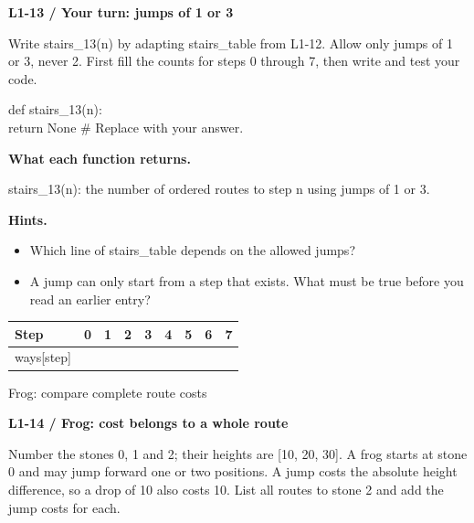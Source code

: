 \documentclass[11pt,a4paper]{article}
\begin{document}
\par\noindent\begin{minipage}{\linewidth}
\textbf{L1-13 / Your turn: jumps of 1 or 3}\par\smallskip Write stairs\_13(n) by adapting stairs\_table from L1-12. Allow only jumps of 1 or 3, never 2. First fill the counts for steps 0 through 7, then write and test your code.\par
\par{}\par\smallskip\noindent\colorbox{codepaper}{\parbox{\dimexpr\linewidth-2\fboxsep\relax}{\small\ttfamily\raggedright def stairs\_13(n):\\\hspace*{2.4em}return None  \# Replace with your answer.}}\par
{\small\textbf{What each function returns.}\par stairs\_13(n): the number of ordered routes to step n using jumps of 1 or 3.\par }
{\small\textbf{Hints.}}\begin{itemize}\item Which line of stairs\_table depends on the allowed jumps?\item A jump can only start from a step that exists. What must be true before you read an earlier entry?\end{itemize}
\par\smallskip \begingroup\small\setlength{\tabcolsep}{4pt}\renewcommand{\arraystretch}{1.35}\begin{tabularx}{\linewidth}{>{\raggedright\arraybackslash}l>{\raggedright\arraybackslash}X>{\raggedright\arraybackslash}X>{\raggedright\arraybackslash}X>{\raggedright\arraybackslash}X>{\raggedright\arraybackslash}X>{\raggedright\arraybackslash}X>{\raggedright\arraybackslash}X>{\raggedright\arraybackslash}X}\toprule\textbf{Step} & \textbf{0} & \textbf{1} & \textbf{2} & \textbf{3} & \textbf{4} & \textbf{5} & \textbf{6} & \textbf{7}\\\midrule
ways[step] & 1 &  &  &  &  &  &  & \\
\bottomrule\end{tabularx}\endgroup\par\smallskip 
\end{minipage}\par\vspace{2mm}
\par\noindent\begin{minipage}{\linewidth}
{\heavy\fontsize{12}{15}\selectfont Frog: compare complete route costs\par}\medskip
\textbf{L1-14 / Frog: cost belongs to a whole route}\par\smallskip Number the stones 0, 1 and 2; their heights are [10, 20, 30]. A frog starts at stone 0 and may jump forward one or two positions. A jump costs the absolute height difference, so a drop of 10 also costs 10. List all routes to stone 2 and add the jump costs for each.\par
\end{minipage}\par\vspace{2mm}
\end{document}
